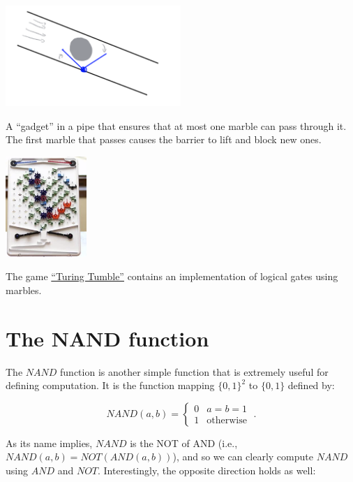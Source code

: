 \begin{marginfigure}
\centering
\includegraphics[width=\linewidth, height=1.5in, keepaspectratio]{../figure/gadget.png}
\caption{A ``gadget'' in a pipe that ensures that at most one marble can
pass through it. The first marble that passes causes the barrier to lift
and block new ones.}
\label{gadgetfig}
\end{marginfigure}


\begin{marginfigure}
\centering
\includegraphics[width=\linewidth, height=1.5in, keepaspectratio]{../figure/turingtumble.png}
\caption{The game \href{https://www.turingtumble.com/}{``Turing
Tumble''} contains an implementation of logical gates using marbles.}
\label{turingtumblefig}
\end{marginfigure}

\section{The NAND function}\label{nandsec}

The \(\ensuremath{\mathit{NAND}}\) function is another simple function
that is extremely useful for defining computation. It is the function
mapping \(\{0,1\}^2\) to \(\{0,1\}\) defined by:

\[\ensuremath{\mathit{NAND}}(a,b) = \begin{cases} 0 & a=b=1 \\ 1 & \text{otherwise} \end{cases}\;.\]

As its name implies, \(\ensuremath{\mathit{NAND}}\) is the NOT of AND
(i.e.,
\(\ensuremath{\mathit{NAND}}(a,b)= \ensuremath{\mathit{NOT}}(\ensuremath{\mathit{AND}}(a,b))\)),
and so we can clearly compute \(\ensuremath{\mathit{NAND}}\) using
\(\ensuremath{\mathit{AND}}\) and \(\ensuremath{\mathit{NOT}}\).
Interestingly, the opposite direction holds as well:

